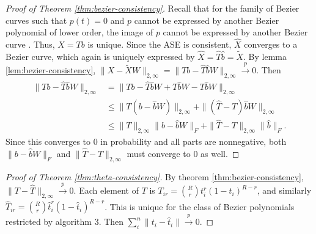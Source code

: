 \documentclass[12pt]{article}
\begin{document}
\begin{proof}[Proof of Theorem \ref{thm:bezier-consistency}]
Recall that for the family of Bezier curves such that $p(t) = 0$ and $p$ cannot be expressed by another Bezier polynomial of lower order, the image of $p$ cannot be expressed by another Bezier curve \citep{SANCHEZREYES2022102118}. 
Thus, $X = T b$ is unique. 
Since the ASE is consistent, $\hat{X}$ converges to a Bezier curve, which again is uniquely expressed by $\hat{X} = \hat{T} \hat{b} = \tilde{X}$. 
By lemma \ref{lem:bezier-consistency}, $\|X - \tilde{X} W\|_{2, \infty} = \|T b - \hat{T} \hat{b} W\|_{2, \infty} \stackrel{p}{\to} 0$.
Then
$$
\begin{aligned}
\|T b - \hat{T} \hat{b} W\|_{2, \infty} & = \|T b - \hat{T} \hat{b} W + T \hat{b} W - T \hat{b} W\|_{2,\infty} \\
& \leq \|T (b - \hat{b} W) \|_{2,\infty} + \|(\hat{T} - T) \hat{b} W\|_{2, \infty}\\
& \leq \|T\|_{2, \infty} \|b - \hat{b} W\|_F + \|\hat{T} - T\|_{2, \infty} \|\hat{b}\|_F.
\end{aligned}
$$
Since this converges to $0$ in probability and all parts are nonnegative, both $\|b - \hat{b} W\|_F$ and $\|\hat{T} - T\|_{2, \infty}$ must converge to 0 as well. 
\end{proof}

\begin{proof}[Proof of Theorem \ref{thm:theta-consistency}]
By theorem \ref{thm:bezier-consistency}, $\|T - \hat{T}\|_{2, \infty} \stackrel{p}{\to} 0$. 
Each element of $T$ is $T_{ir} = \binom{R}{r} t_i^r (1 - t_i)^{R-r}$, and similarly $\hat{T}_{ir} = \binom{R}{r} \hat{t}_i^r (1 - \hat{t}_i)^{R-r}$. 
This is unique for the class of Bezier polynomials restricted by algorithm 3. 
Then $\sum_i^n \|t_i - \hat{t}_i\| \stackrel{p}{\to} 0$. 
\end{proof}

\newpage


\renewcommand\refname{Bibliography}

\end{document}

